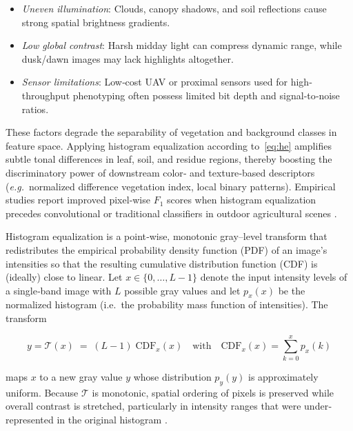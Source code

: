 \documentclass[letterpaper, notitlepage]{report}
\begin{document}
\begin{itemize}
    \item \emph{Uneven illumination}: Clouds, canopy shadows, and soil reflections cause strong spatial brightness gradients.
    \item \emph{Low global contrast}: Harsh midday light can compress dynamic range, while dusk/dawn images may lack highlights altogether.
    \item \emph{Sensor limitations}: Low‐cost UAV or proximal sensors used for high‐throughput phenotyping often possess limited bit depth and signal‐to‐noise ratios.
\end{itemize}

These factors degrade the separability of vegetation and background classes in feature space.  Applying histogram equalization according to~\eqref{eq:he} amplifies subtle tonal differences in leaf, soil, and residue regions, thereby boosting the discriminatory power of downstream color‐ and texture‐based descriptors (\textit{e.g.}\ normalized difference vegetation index, local binary patterns).  Empirical studies report improved pixel‐wise ${F}_1$ scores when histogram equalization precedes convolutional or traditional classifiers in outdoor agricultural scenes \parencite{Potena2017-md, Wendel2016-gy}.

Histogram equalization is a point‐wise, monotonic gray–level transform that redistributes the empirical probability density function (PDF) of an image’s intensities so that the resulting cumulative distribution function (CDF) is (ideally) close to linear.  
Let $x\in\{0,\ldots,L-1\}$ denote the input intensity levels of a single‐band image with $L$ possible gray values and let $p_x(x)$ be the normalized histogram (i.e.\ the probability mass function of intensities).  The transform

\begin{equation}
    y = \mathcal{T}(x) \;=\; (L-1)\; \mathrm{CDF}_x(x)
    \quad\text{with}\quad
    \mathrm{CDF}_x(x)=\sum_{k=0}^{x} p_x(k)
    \label{eq:he}
\end{equation}

maps $x$ to a new gray value $y$ whose distribution $p_y(y)$ is approximately uniform.  Because $\mathcal{T}$ is monotonic, spatial ordering of pixels is preserved while overall contrast is stretched, particularly in intensity ranges that were under‐represented in the original histogram \parencite{Gonzalez2016-xu, Pizer1987-kd}.
\end{document}
